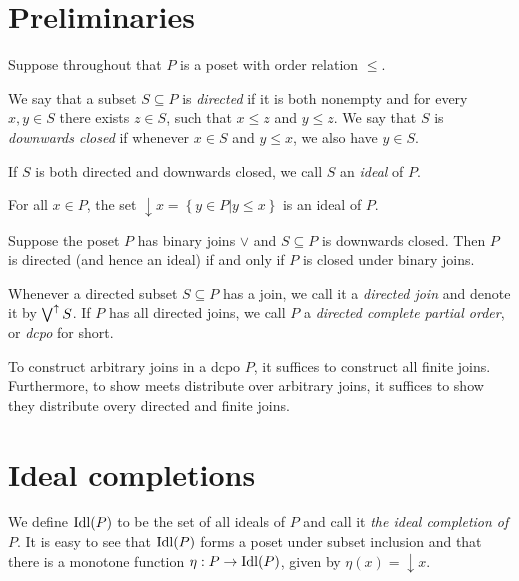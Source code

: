 \section{Preliminaries}
Suppose throughout that \(P\) is a poset with order relation \(\leq\).
\begin{definition}
  We say that a subset \(S \subseteq P\) is \emph{directed} if it is both nonempty and for every \(x, y \in S\) there exists \(z \in S\), such that \(x \leq z\) and \(y \leq z\).
  We say that \(S\) is \emph{downwards closed} if whenever \(x \in S\) and \(y \leq x\), we also have \(y \in S\).

  If \(S\) is both directed and downwards closed, we call \(S\) an \emph{ideal} of \(P\).
\end{definition}

\begin{lemma}
  For all \(x \in P\), the set \(\downarrow x = \left\{y \in P \vert y \leq x\right\}\) is an ideal of \(P\).
\end{lemma}

\begin{lemma}
  Suppose the poset \(P\) has binary joins \(\vee\) and \(S \subseteq P\) is downwards closed.
  Then \(P\) is directed (and hence an ideal) if and only if \(P\) is closed under binary joins. 
\end{lemma}

\begin{definition}
  Whenever a directed subset \(S \subseteq P\) has a join, we call it a \emph{directed join} and denote it by \(\bigvee^{\uparrow} S\). If \(P\) has all directed joins, we call \(P\) a \emph{directed complete partial order}, or \emph{dcpo} for short.
\end{definition}

\begin{lemma}
  To construct arbitrary joins in a dcpo \(P\), it suffices to construct all finite joins. Furthermore, to show meets distribute over arbitrary joins, it suffices to show they distribute overy directed and finite joins.
\end{lemma}

\section{Ideal completions}

\begin{definition}
  We define \(\operatorname{Idl}(P)\) to be the set of all ideals of \(P\) and call it \emph{the ideal completion of \(P\)}. It is easy to see that \(\operatorname{Idl}(P)\) forms a poset under subset inclusion and that there is a monotone function \(\eta : P \to \operatorname{Idl}(P)\), given by \(\eta(x) = \downarrow x\).
\end{definition}

